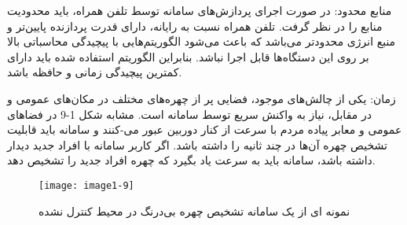 \noindent
منابع محدود: در صورت اجرای پردازش‌های سامانه توسط تلفن همراه، باید محدودیت منابع را در نظر گرفت. تلفن همراه نسبت به رایانه، دارای قدرت پردازنده پایین‌تر و منبع انرژی محدودتر می‌باشد که باعث می‌شود الگوریتم‌هایی با پیچیدگی محاسباتی بالا بر روی این دستگاه‌ها قابل اجرا نباشد. بنابراین الگوریتم استفاده شده باید دارای کمترین پیچیدگی زمانی و حافظه باشد.

\noindent
زمان: یکی از چالش‌های موجود، فضایی پر از چهره‌های مختلف در مکان‌های عمومی و در مقابل، نیاز به واکنش سریع توسط سامانه است. مشابه شکل 1-9 در فضاهای عمومی و معابر پیاده مردم با سرعت از کنار دوربین عبور می-کنند و سامانه باید قابلیت تشخیص چهره آن‌ها در چند ثانیه را داشته باشد. اگر کاربر سامانه با افراد جدید دیدار داشته باشد، سامانه باید به سرعت یاد بگیرد که چهره افراد جدید را تشخیص دهد. 

\begin{figure}[!h]
\centering
\texttt{[image: image1-9]}
\caption{نمونه ای از یک سامانه تشخیص چهره بی‌درنگ در محیط کنترل نشده \cite{ref13}}\label{image1-9}
\end{figure}
 